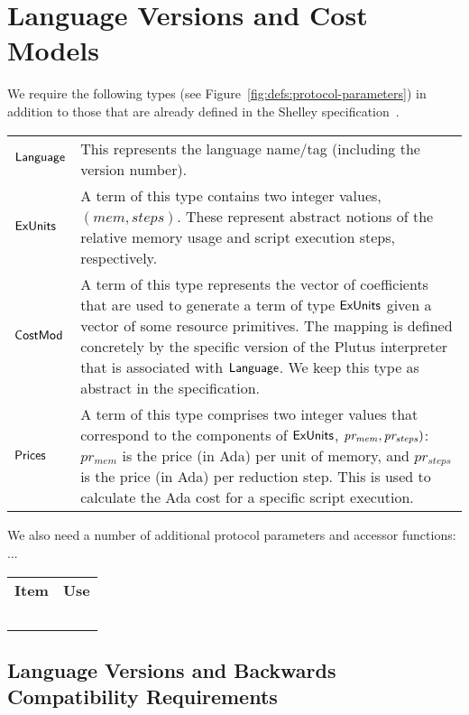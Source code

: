\section{Language Versions and Cost Models}
\label{sec:protocol-parameters}

We require the following types (see Figure~\ref{fig:defs:protocol-parameters})
in addition to those that are already defined in the Shelley specification~\cite{XX}. 

\vspace{12pt}
\begin{tabular}{lp{5in}}
  $\mathsf{Language}$ &
  This represents the language name/tag (including the
  version number).
  \\
  $\mathsf{ExUnits}$ &
  A term of this type contains two integer values,
  $(mem, steps)$.
  These represent abstract notions of the relative memory usage and script execution steps,
  respectively.
  \\
  $\mathsf{CostMod}$ &
  A term of this type represents the vector of coefficients that are used to generate
  a term of type $\mathsf{ExUnits}$ given a vector of some resource primitives. The mapping is defined
  concretely by the specific version of the Plutus interpreter that is associated with $\mathsf{Language}$.
  We keep this type as abstract in the specification.
  \\
  $\mathsf{Prices}$ &
  A term of this type comprises two integer values that correspond to the components of $\mathsf{ExUnits}$,
  $\mathit{pr_{mem}, pr_{steps})}$:
  $pr_{mem}$ is the price (in Ada) per unit of memory, and $pr_{steps}$ is the price (in Ada) per
  reduction step. This is used to calculate the Ada cost for a specific script execution.
\end{tabular}
\vspace{12pt}

We also need a number of additional protocol parameters and accessor functions: ...

\begin{tabular}{||l|l||}
  \textbf{Item} & \textbf{Use} \\
  \
  \end{tabular}

\subsection{Language Versions and Backwards Compatibility Requirements}
\label{sec:versions}

